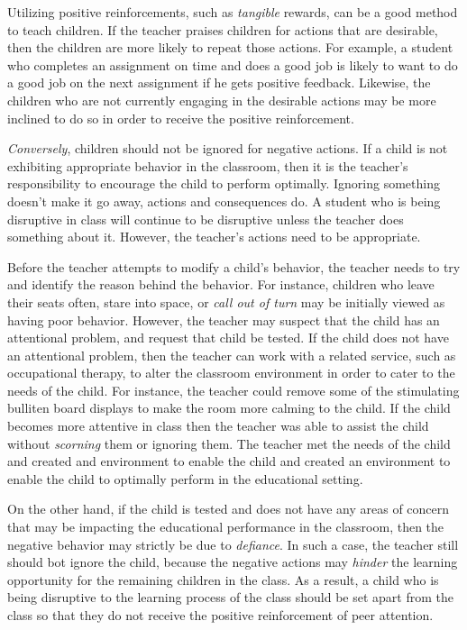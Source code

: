 Utilizing positive reinforcements, such as \emph{tangible} rewards, can be a good method to teach children.
If the teacher praises children for actions that are desirable, then the children are more likely to repeat those actions.
For example, a student who completes an assignment on time and does a good job is likely to want to do a good job on the next assignment if he gets positive feedback.
Likewise, the children who are not currently engaging in the desirable actions may be more inclined to do so in order to receive the positive reinforcement.

\emph{Conversely}, children should not be ignored for negative actions.
If a child is not exhibiting appropriate behavior in the classroom, then it is the teacher's responsibility to encourage the child to perform optimally.
Ignoring something doesn't make it go away, actions and consequences do.
A student who is being disruptive in class will continue to be disruptive unless the teacher does something about it.
However, the teacher's actions need to be appropriate.

Before the teacher attempts to modify a child's behavior, the teacher needs to try and identify the reason behind the behavior.
For instance, children who leave their seats often, stare into space, or \emph{call out of turn} may be initially viewed as having poor behavior.
However, the teacher may suspect that the child has an attentional problem, and request that child be tested.
If the child does not have an attentional problem, then the teacher can work with a related service, such as occupational therapy, to alter the classroom environment in order to cater to the needs of the child.
For instance, the teacher could remove some of the stimulating bulliten board displays to make the room more calming to the child.
If the child becomes more attentive in class then the teacher was able to assist the child without \emph{scorning} them or ignoring them.
The teacher met the needs of the child and created and environment to enable the child and created an environment to enable the child to optimally perform in the educational setting.

On the other hand, if the child is tested and does not have any areas of concern that may be impacting the educational performance in the classroom, then the negative behavior may strictly be due to \emph{defiance}.
In such a case, the teacher still should bot ignore the child, because the negative actions may \emph{hinder} the learning opportunity for the remaining children in the class.
As a result, a child who is being disruptive to the learning process of the class should be set apart from the class so that they do not receive the positive reinforcement of peer attention.

